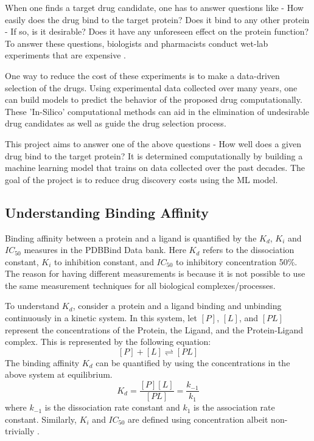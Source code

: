 \documentclass[11pt]{article}
\begin{document}
When one finds a target drug candidate,  one has to answer questions like - How easily does the drug bind to the target protein? Does it bind to any other protein - If so, is it desirable? Does it have any unforeseen effect on the protein function?  To answer these questions, biologists and pharmacists conduct wet-lab experiments that are expensive \cite{drugdiscoverycost}.

One way to reduce the cost of these experiments is to make a data-driven selection of the drugs.  Using experimental data collected over many years, one can build models to predict the behavior of the proposed drug computationally.  These 'In-Silico' computational methods can aid in the elimination of undesirable drug candidates as well as guide the drug selection process.

This project aims to answer one of the above questions - How well does a given drug bind to the target protein? It is determined computationally by building a machine learning model that trains on data collected over the past decades. The goal of the project is to reduce drug discovery costs using the ML model. 

\subsection{Understanding Binding Affinity}
Binding affinity between a protein and a ligand is quantified by the $K_d$, $K_i$ and $IC_{50}$ measures in the PDBBind Data bank.
Here $K_d$ refers to the dissociation constant, $K_i$ to inhibition constant, and $IC_{50}$ to 
inhibitory concentration 50\%.
The reason for having different measurements is because it is not possible to use the same measurement techniques
for all biological complexes/processes.

To understand $K_d$, consider a protein and a ligand binding and unbinding continuously in a kinetic system.
In this system, let $[P]$, $[L]$, and $[PL]$ represent the concentrations of the Protein, the Ligand, and the Protein-Ligand complex.
This is represented by the following equation:
$$[P] + [L] \rightleftharpoons [PL]$$
The binding affinity $K_d$ can be quantified by using the concentrations in the above system at equilibrium.
$$K_d = \frac{[P][L]}{[PL]} = \frac{k_{-1}}{k_1}$$
where $k_{-1}$ is the dissociation rate constant and $k_1$ is the association rate constant.
Similarly, $K_i$ and $IC_{50}$ are defined using concentration albeit non-trivially
\cite{binding_affinity_description} \cite{proteinlingandbindingpaper}.
\end{document}
